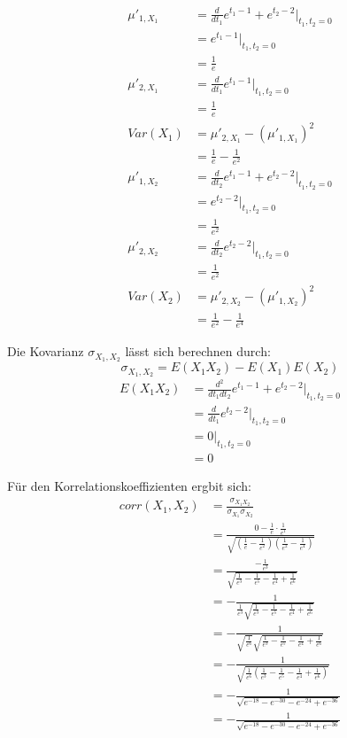 \documentclass{article}
\begin{document}
\begin{align*}
    \mu'_{1, X_1} &= \frac{d}{dt_1} e^{t_1-1}+e^{t_2 -2} \bigg|_{t_1, t_2= 0} \\
    &= e^{t_1-1} \bigg|_{t_1, t_2 = 0} \\
    &= \frac{1}{e} \\
    \mu'_{2, X_1} &= \frac{d}{dt_1} e^{t_1-1} \bigg|_{t_1, t_2 = 0}\\
    &= \frac{1}{e} \\
    Var(X_1) &= \mu'_{2, X_1} - (\mu'_{1, X_1})^2 \\
    &= \frac{1}{e} - \frac{1}{e^2}\\
    \mu'_{1, X_2} &= \frac{d}{dt_2} e^{t_1-1}+e^{t_2 -2} \bigg|_{t_1, t_2= 0} \\
    &= e^{t_2-2} \bigg|_{t_1, t_2 = 0} \\
    &= \frac{1}{e^2} \\
    \mu'_{2, X_2} &= \frac{d}{dt_2} e^{t_2-2} \bigg|_{t_1, t_2 = 0}\\
    &= \frac{1}{e^2} \\
    Var(X_2) &= \mu'_{2, X_2} - (\mu'_{1, X_2})^2 \\
    &= \frac{1}{e^2} - \frac{1}{e^4}
\end{align*} 

Die Kovarianz $\sigma_{X_1, X_2}$ lässt sich berechnen durch:\[\sigma_{X_1, X_2} = E(X_1X_2) - E(X_1)E(X_2)\]
\begin{align*}
    E(X_1X_2)&= \frac{d^2}{dt_1 dt_2} e^{t_1-1}+e^{t_2 -2} \bigg|_{t_1, t_2 = 0} \\
    &= \frac{d}{dt_1} e^{t_2 -2} \bigg|_{t_1, t_2 = 0} \\
    &= 0 \bigg|_{t_1, t_2 = 0} \\
    &= 0 
\end{align*}

Für den Korrelationskoeffizienten ergbit sich:
\begin{align*}
    corr(X_1, X_2) &= \frac{\sigma_{X_1 X_2}}{\sigma_{X_1} \sigma_{X_2}} \\
    &= \frac{0 - \frac{1}{e}\cdot\frac{1}{e^1}}{\sqrt{(\frac{1}{e} - \frac{1}{e^2})(\frac{1}{e^2} - \frac{1}{e^4})}} \\
    &=\frac{-\frac{1}{e^3}}{\sqrt{\frac{1}{e^3} - \frac{1}{e^5} - \frac{1}{e^4} + \frac{1}{e^6}}} \\
    &=- \frac{1}{\frac{1}{e^3}\sqrt{\frac{1}{e^3} - \frac{1}{e^5} - \frac{1}{e^4} + \frac{1}{e^6}}} \\
    &= - \frac{1}{\sqrt{\frac{1}{e^6}}\sqrt{\frac{1}{e^3} - \frac{1}{e^5} - \frac{1}{e^4} + \frac{1}{e^6}}} \\
    &= - \frac{1}{\sqrt{\frac{1}{e^6}(\frac{1}{e^3} - \frac{1}{e^5} - \frac{1}{e^4} + \frac{1}{e^6})}} \\
    &= - \frac{1}{\sqrt{e^{-18} - e^{-30 }-e^{-24} + e^{-36}}}\\
    &= - \frac{1}{\sqrt{e^{-18} - e^{-30 }-e^{-24} + e^{-36}}}\\
\end{align*}
\end{document}
